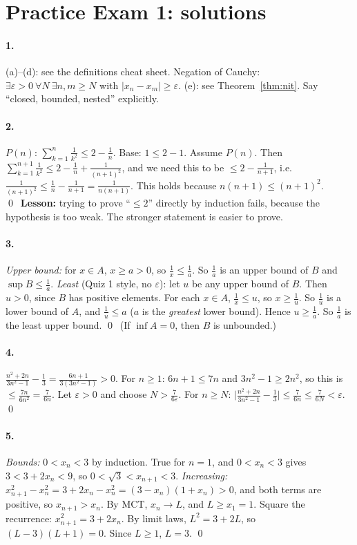 \documentclass[11pt]{article}
\theoremstyle{definition}
\newcommand{\eps}{\varepsilon}
\newcommand{\key}[1]{\textcolor{red!70!black}{\textbf{#1}}}
\begin{document}
\section{Practice Exam 1: solutions}

\paragraph{1.} (a)--(d): see the definitions cheat sheet. Negation of
Cauchy: $\exists\eps>0\ \forall N\ \exists n,m\ge N$ with
$|x_n-x_m|\ge\eps$. (e): see Theorem~\ref{thm:nit}. Say ``closed,
bounded, nested'' explicitly.

\paragraph{2.} $P(n)$: $\sum_{k=1}^n\frac1{k^2}\le2-\frac1n$. Base:
$1\le2-1$. Assume $P(n)$. Then
$\sum_{k=1}^{n+1}\frac1{k^2}\le2-\frac1n+\frac1{(n+1)^2}$, and we need
this to be $\le2-\frac1{n+1}$, i.e.
$\frac1{(n+1)^2}\le\frac1n-\frac1{n+1}=\frac1{n(n+1)}$. This holds because
$n(n+1)\le(n+1)^2$. \qed\
\key{Lesson:} trying to prove ``$\le2$'' directly by induction fails,
because the hypothesis is too weak. The stronger statement is easier to
prove.

\paragraph{3.} \emph{Upper bound:} for $x\in A$, $x\ge a>0$, so
$\frac1x\le\frac1a$. So $\frac1a$ is an upper bound of $B$ and
$\sup B\le\frac1a$.
\emph{Least} (Quiz 1 style, no $\eps$): let $u$ be any upper bound of $B$.
Then $u>0$, since $B$ has positive elements. For each $x\in A$,
$\frac1x\le u$, so $x\ge\frac1u$. So $\frac1u$ is a lower bound of $A$,
and $\frac1u\le a$ ($a$ is the \emph{greatest} lower bound). Hence
$u\ge\frac1a$. So $\frac1a$ is the least upper bound. \qed\
(If $\inf A=0$, then $B$ is unbounded.)

\paragraph{4.} $\frac{n^2+2n}{3n^2-1}-\frac13=\frac{6n+1}{3(3n^2-1)}>0$.
For $n\ge1$: $6n+1\le7n$ and $3n^2-1\ge2n^2$, so this is
$\le\frac{7n}{6n^2}=\frac7{6n}$. Let $\eps>0$ and choose
$N>\frac7{6\eps}$. For $n\ge N$:
$\bigl|\frac{n^2+2n}{3n^2-1}-\frac13\bigr|\le\frac7{6n}\le\frac7{6N}<\eps$.
\qed

\paragraph{5.} \emph{Bounds:} $0<x_n<3$ by induction. True for $n=1$,
and $0<x_n<3$ gives $3<3+2x_n<9$, so $0<\sqrt3<x_{n+1}<3$.
\emph{Increasing:} $x_{n+1}^2-x_n^2=3+2x_n-x_n^2=(3-x_n)(1+x_n)>0$, and
both terms are positive, so $x_{n+1}>x_n$.
By MCT, $x_n\to L$, and $L\ge x_1=1$. Square the recurrence:
$x_{n+1}^2=3+2x_n$. By limit laws, $L^2=3+2L$, so $(L-3)(L+1)=0$. Since
$L\ge1$, $L=3$. \qed
\end{document}
